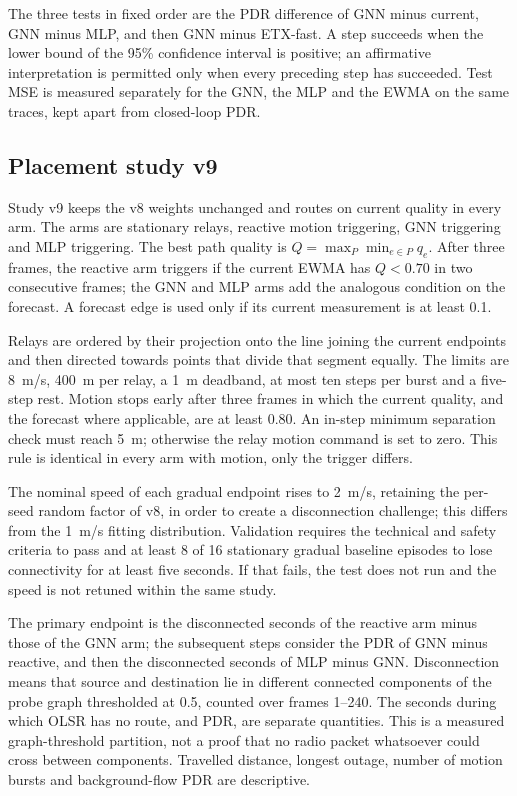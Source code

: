 The three tests in fixed order are the PDR difference of GNN minus current, GNN
minus MLP, and then GNN minus ETX-fast. A step succeeds when the lower bound of
the 95\% confidence interval is positive; an affirmative interpretation is
permitted only when every preceding step has succeeded. Test MSE is measured
separately for the GNN, the MLP and the EWMA on the same  traces,
kept apart from closed-loop PDR.

\subsection{Placement study v9}
Study v9 keeps the v8 weights unchanged and routes on current quality in every
arm. The arms are stationary relays, reactive motion triggering, GNN triggering
and MLP triggering. The best path quality is $Q=\max_P\min_{e\in P}q_e$. After
three frames, the reactive arm triggers if the current EWMA has $Q<0.70$ in two
consecutive frames; the GNN and MLP arms add the analogous condition on the
forecast. A forecast edge is used only if its current measurement is at least
0.1.

Relays are ordered by their projection onto the line joining the current
endpoints and then directed towards points that divide that segment equally. The
limits are 8~m/s, 400~m per relay, a 1~m deadband, at most ten steps per burst
and a five-step rest. Motion stops early after three frames in which the current
quality, and the forecast where applicable, are at least 0.80. An in-step
minimum separation check must reach 5~m; otherwise the relay motion command is
set to zero. This rule is identical in every arm with motion, only the trigger
differs.

The nominal speed of each gradual endpoint rises to 2~m/s, retaining the
per-seed random factor of v8, in order to create a disconnection challenge; this
differs from the 1~m/s fitting distribution. Validation requires the technical
and safety criteria to pass and at least 8 of 16 stationary gradual baseline
episodes to lose connectivity for at least five seconds. If that fails, the test
does not run and the speed is not retuned within the same study.

The primary endpoint is the disconnected seconds of the reactive arm minus those
of the GNN arm; the subsequent steps consider the PDR of GNN minus reactive, and
then the disconnected seconds of MLP minus GNN. Disconnection means that source
and destination lie in different connected components of the probe graph
thresholded at 0.5, counted over frames 1--240. The seconds during which OLSR
has no route, and PDR, are separate quantities. This is a measured
graph-threshold partition, not a proof that no radio packet whatsoever could
cross between components. Travelled distance, longest outage, number of motion
bursts and background-flow PDR are descriptive.

